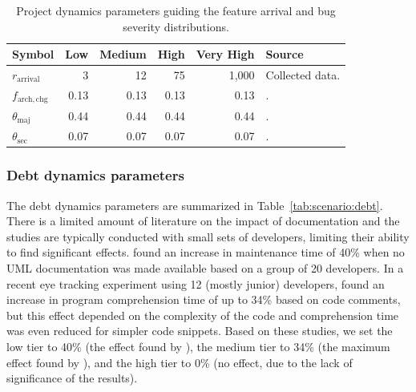 \documentclass[smallextended]{svjour3}       %
\begin{document}
\begin{table}[t]
\caption{Project dynamics parameters guiding the feature arrival and bug severity distributions.}
\label{tab:scenario:project}
\footnotesize
\begin{tabularx}{\linewidth}{p{1.8cm}rrrrX}
\toprule
Symbol & Low & Medium & High & Very High & Source \\
\midrule
$r_\mathrm{arrival}$  & 3  & 12  & 75  & 1{,}000 & Collected data. \\[2pt]
$f_\mathrm{arch,chg}$  & 0.13  & 0.13  & 0.13  & 0.13 & \cite{shahbazian2018toward}. \\[2pt]
$\theta_\mathrm{maj}$ & 0.44 & 0.44 & 0.44 & 0.44 & \cite{ohira2015highimpact}. \\[2pt]
$\theta_\mathrm{sec}$ & 0.07 & 0.07 & 0.07 & 0.07 & \cite{ohira2015highimpact}. \\
\bottomrule
\end{tabularx}
\end{table}

\subsubsection{Debt dynamics parameters}

The debt dynamics parameters are summarized in Table~\ref{tab:scenario:debt}. There is a limited amount of literature on the impact of documentation and the studies are typically conducted with small sets of developers, limiting their ability to find significant effects. \cite{dzidek2008uml} found an increase in maintenance time of 40\% when no UML documentation was made available based on a group of 20 developers. In a recent eye tracking experiment using 12 (mostly junior) developers, \cite{abdelsalam2026comments} found an increase in program comprehension time of up to 34\% based on code comments, but this effect depended on the complexity of the code and comprehension time was even reduced for simpler code snippets. Based on these studies, we set the low tier to 40\% (the effect found by \cite{dzidek2008uml}), the medium tier to 34\% (the maximum effect found by \cite{abdelsalam2026comments}), and the high tier to 0\% (no effect, due to the lack of significance of the results).
\end{document}
